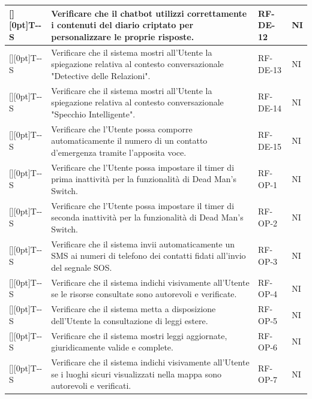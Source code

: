 \documentclass[a4paper,12pt]{article}
\newcounter{testsys}
\newcommand{\systestcode}{%
  \raisebox{0pt}[\height][0pt]{\hypertarget{T-\arabic{testsys}-S}{}}T-\arabic{testsys}-S%
}
\begin{document}
\begin{longtable}{| >{\centering\arraybackslash}p{} | >{\raggedright\arraybackslash}p{} | >{\centering\arraybackslash}p{} | >{\centering\arraybackslash}p{} |}
\stepcounter{testsys} \systestcode & Verificare che il chatbot utilizzi correttamente i contenuti del diario criptato per personalizzare le proprie risposte. & RF-DE-12 & NI \\
\hline

\stepcounter{testsys} \systestcode & Verificare che il sistema mostri all'Utente la spiegazione relativa al contesto conversazionale "Detective delle Relazioni". & RF-DE-13 & NI \\
\hline

\stepcounter{testsys} \systestcode & Verificare che il sistema mostri all'Utente la spiegazione relativa al contesto conversazionale "Specchio Intelligente". & RF-DE-14 & NI \\
\hline

\stepcounter{testsys} \systestcode & Verificare che l'Utente possa comporre automaticamente il numero di un contatto d'emergenza tramite l'apposita voce. & RF-DE-15 & NI \\
\hline

\stepcounter{testsys} \systestcode & Verificare che l'Utente possa impostare il timer di prima inattività per la funzionalità di Dead Man's Switch. & RF-OP-1 & NI \\
\hline

\stepcounter{testsys} \systestcode & Verificare che l'Utente possa impostare il timer di seconda inattività per la funzionalità di Dead Man's Switch. & RF-OP-2 & NI \\
\hline

\stepcounter{testsys} \systestcode & Verificare che il sistema invii automaticamente un SMS ai numeri di telefono dei contatti fidati all'invio del segnale SOS. & RF-OP-3 & NI \\
\hline

\stepcounter{testsys} \systestcode & Verificare che il sistema indichi visivamente all'Utente se le risorse consultate sono autorevoli e verificate. & RF-OP-4 & NI \\
\hline

\stepcounter{testsys} \systestcode & Verificare che il sistema metta a disposizione dell'Utente la consultazione di leggi estere. & RF-OP-5 & NI \\
\hline

\stepcounter{testsys} \systestcode & Verificare che il sistema mostri leggi aggiornate, giuridicamente valide e complete. & RF-OP-6 & NI \\
\hline

\stepcounter{testsys} \systestcode & Verificare che il sistema indichi visivamente all'Utente se i luoghi sicuri visualizzati nella mappa sono autorevoli e verificati. & RF-OP-7 & NI \\
\hline
\end{longtable}
\endgroup
\end{document}

